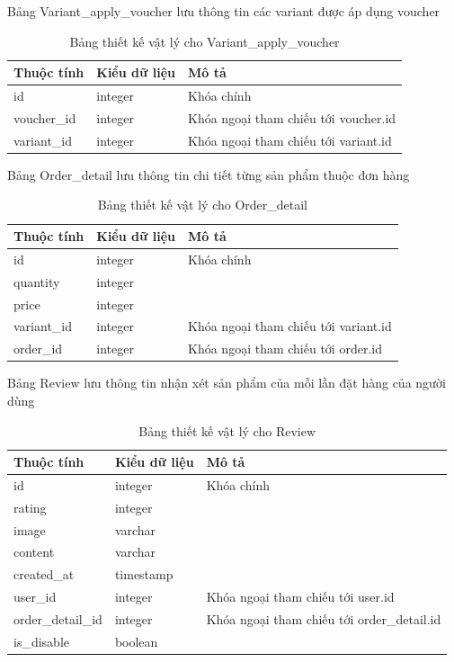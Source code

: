 \noindent Bảng Variant\_apply\_voucher lưu thông tin các variant được áp dụng voucher
\begin{table}[H]
\centering
\begin{tabular}{|p{4cm}|p{3cm}|p{7cm}|}
\hline
Thuộc tính & Kiểu dữ liệu & Mô tả \\
\hline
id & integer & Khóa chính \\
\hline
voucher\_id & integer & Khóa ngoại tham chiếu tới voucher.id \\
\hline
variant\_id & integer & Khóa ngoại tham chiếu tới variant.id\\
\hline
\end{tabular}
\caption{Bảng thiết kế vật lý cho Variant\_apply\_voucher}
\end{table}

\newpage
\noindent Bảng Order\_detail lưu thông tin chi tiết từng sản phẩm thuộc đơn hàng

\begin{table}[H]
\centering
\begin{tabular}{|p{4cm}|p{3cm}|p{7cm}|}
\hline
Thuộc tính & Kiểu dữ liệu & Mô tả \\
\hline
id & integer & Khóa chính \\
\hline
quantity & integer & \\
\hline
price & integer & \\
\hline
variant\_id & integer & Khóa ngoại tham chiếu tới variant.id \\
\hline
order\_id & integer & Khóa ngoại tham chiếu tới order.id \\
\hline
\end{tabular}
\caption{Bảng thiết kế vật lý cho Order\_detail}
\end{table}


\noindent Bảng Review lưu thông tin nhận xét sản phẩm của mỗi lần đặt hàng của người dùng

\begin{table}[H]
\centering
\begin{tabular}{|p{4cm}|p{3cm}|p{7cm}|}
\hline
Thuộc tính & Kiểu dữ liệu & Mô tả \\
\hline
id & integer & Khóa chính \\
\hline
rating & integer & \\
\hline
image & varchar & \\
\hline
content & varchar & \\
\hline
created\_at & timestamp & \\
\hline
user\_id & integer & Khóa ngoại tham chiếu tới user.id \\
\hline
order\_detail\_id & integer & Khóa ngoại tham chiếu tới order\_detail.id \\
\hline
is\_disable & boolean & \\
\hline

\end{tabular}
\caption{Bảng thiết kế vật lý cho Review}
\end{table}

